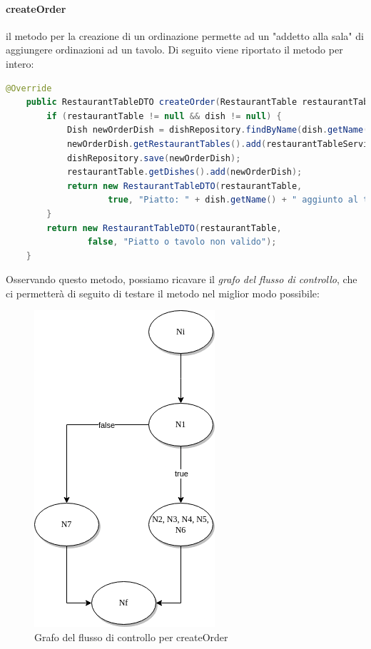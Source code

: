 \paragraph{createOrder} il metodo per la creazione di un ordinazione permette ad un "addetto alla sala" di aggiungere ordinazioni ad un tavolo. Di seguito viene riportato il metodo per intero:
\begin{lstlisting}[language=java]
    @Override
    public RestaurantTableDTO createOrder(RestaurantTable restaurantTable, Dish dish) {
        if (restaurantTable != null && dish != null) {
            Dish newOrderDish = dishRepository.findByName(dish.getName());
            newOrderDish.getRestaurantTables().add(restaurantTableService.findById(restaurantTable.getId()));
            dishRepository.save(newOrderDish);
            restaurantTable.getDishes().add(newOrderDish);
            return new RestaurantTableDTO(restaurantTable,
                    true, "Piatto: " + dish.getName() + " aggiunto al tavolo: " + restaurantTable.getId().toString());
        }
        return new RestaurantTableDTO(restaurantTable,
                false, "Piatto o tavolo non valido");
    }
\end{lstlisting}
Osservando questo metodo, possiamo ricavare il \textit{grafo del flusso di controllo}, che ci permetterà di seguito di testare il metodo nel miglior modo possibile:
\begin{figure}[H]
    \centering
    \includegraphics[scale=0.8]{img/whiteBox/createOrder.png}
    \caption{Grafo del flusso di controllo per createOrder}
\end{figure}
